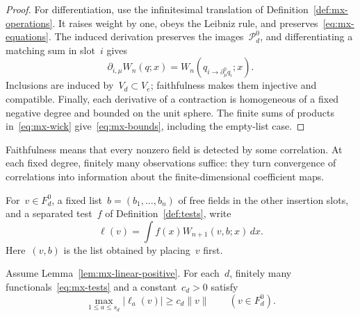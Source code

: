\begin{proof}
For differentiation, use the infinitesimal translation of Definition~\ref{def:mx-operations}.
It raises weight by one, obeys the Leibniz rule, and preserves~\eqref{eq:mx-equations}.
The induced derivation preserves the images~$\mathcal P_d^0$, and differentiating a matching sum in slot~$i$ gives
\begin{equation*}
 \partial_{i,\mu}W_n(q;x)=W_n(q_{i\to\partial_\mu^0q_i};x).
\end{equation*}
Inclusions are induced by~$V_d\subset V_e$; faithfulness makes them injective and compatible.
Finally, each derivative of a contraction is homogeneous of a fixed negative degree and bounded on the unit sphere.
The finite sums of products in~\eqref{eq:mx-wick} give~\eqref{eq:mx-bounds}, including the empty-list case.
\end{proof}

Faithfulness means that every nonzero field is detected by some correlation. At each fixed degree, finitely many observations suffice: they turn convergence of correlations into information about the finite-dimensional coefficient maps.
\begin{definition}\label{def:mx-tests}
For~$v\in F_d^0$, a fixed list~$b=(b_1,\ldots,b_n)$ of free fields in the other insertion slots, and a separated test~$f$ of Definition~\ref{def:tests}, write
\begin{equation}\label{eq:mx-tests}
 \ell(v)=\int f(x)W_{n+1}(v,b;x)\,dx.
\end{equation}
Here~$(v,b)$ is the list obtained by placing~$v$ first.
\end{definition}

\begin{lemma}\label{lem:mx-tests}
Assume Lemma~\ref{lem:mx-linear-positive}.
For each~$d$, finitely many functionals~\eqref{eq:mx-tests} and a constant~$c_d>0$ satisfy
\begin{equation}\label{eq:mx-detection}
 \max_{1\le a\le s_d}|\ell_a(v)|\ge c_d\|v\|
 \qquad(v\in F_d^0).
\end{equation}
\end{lemma}

